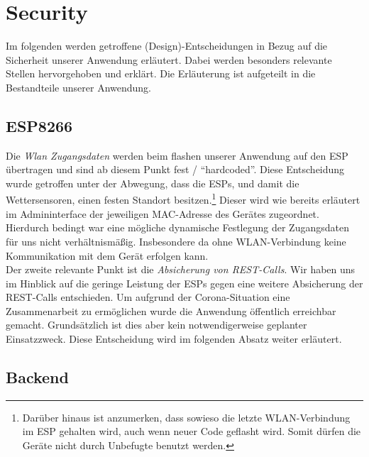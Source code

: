 \section{Security}\label{Security}
Im folgenden werden getroffene (Design)-Entscheidungen in Bezug auf die Sicherheit unserer Anwendung erläutert.
Dabei werden besonders relevante Stellen hervorgehoben und erklärt.
Die Erläuterung ist aufgeteilt in die Bestandteile unserer Anwendung.

\subsection{ESP8266}

Die \textit{Wlan Zugangsdaten} werden beim flashen unserer Anwendung auf den ESP übertragen und sind ab diesem Punkt fest / \enquote{hardcoded}.
Diese Entscheidung wurde getroffen unter der Abwegung, dass die ESPs, und damit die Wettersensoren, einen festen Standort besitzen.\footnote{Darüber hinaus ist anzumerken, dass sowieso die letzte WLAN-Verbindung im ESP gehalten wird, auch wenn neuer Code geflasht wird. Somit dürfen die Geräte nicht durch Unbefugte benutzt werden.}
Dieser wird wie bereits erläutert im Admininterface der jeweiligen MAC-Adresse des Gerätes zugeordnet.
Hierdurch bedingt war eine mögliche dynamische Festlegung der Zugangsdaten für uns nicht verhältnismäßig.
Insbesondere da ohne WLAN-Verbindung keine Kommunikation mit dem Gerät erfolgen kann.\\
Der zweite relevante Punkt ist die \textit{Absicherung von REST-Calls}.
Wir haben uns im Hinblick auf die geringe Leistung der ESPs gegen eine weitere Absicherung der REST-Calls entschieden.
Um aufgrund der Corona-Situation eine Zusammenarbeit zu ermöglichen wurde die Anwendung öffentlich erreichbar gemacht.
Grundsätzlich ist dies aber kein notwendigerweise geplanter Einsatzzweck.
Diese Entscheidung wird im folgenden Absatz weiter erläutert.

\subsection{Backend}

